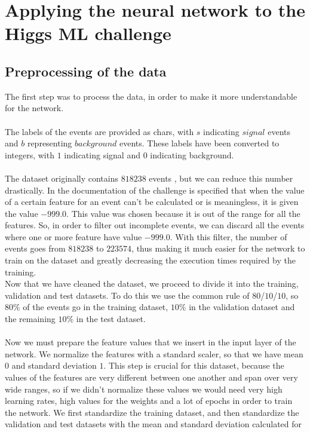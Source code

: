 \documentclass[12pt]{article}
\begin{document}
\section{Applying the neural network to the Higgs ML challenge}
\subsection{Preprocessing of the data}
The first step was to process the data, in order to make it more understandable for the network. \\ \\
The labels of the events are provided as chars, with $s$ indicating $signal$ events and $b$ representing 
$background$ events. These labels have been converted to integers, with $1$ indicating signal and $0$ 
indicating background. \\ \\
The dataset originally contains $818238$ events \cite{CERNOpenDataHiggsML}, but we can reduce this number drastically. In the 
documentation of the challenge is specified that when the value of a certain feature for an event can't be
calculated or is meaningless, it is given the value $-999.0$. This value was chosen because it is out of the 
range for all the features. So, in order to filter out incomplete events, we can discard all the events where
one or more feature have value $-999.0$. With this filter, the number of events goes from $818238$ to 
$223574$, thus making it much easier for the network to train on the dataset and greatly decreasing the 
execution times required by the training. \\
Now that we have cleaned the dataset, we proceed to divide it into the training, validation and test 
datasets. To do this we use the common rule of $80$/$10$/$10$, so $80\%$ of the events go in the training 
dataset, $10 \%$ in the validation dataset and the remaining $10 \%$ in the test dataset. \\ \\
Now we must prepare the feature values that we insert in the input layer of the network. We normalize the 
features with a standard scaler, so that we have mean $0$ and standard deviation $1$. This step is crucial
for this dataset, because the values of the features are very different between one another and span over 
very wide ranges, so if we didn't normalize these values we would need very high learning rates, high values 
for the weights and a lot of epochs in order to train the network. We first standardize the training dataset,
and then standardize the validation and test datasets with the mean and standard deviation calculated for
\end{document}
